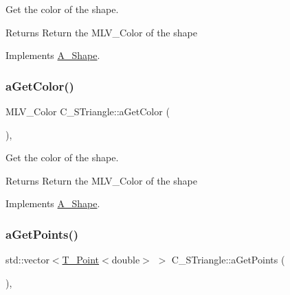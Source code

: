 Get the color of the shape. 

\begin{DoxyReturn}{Returns}
Return the M\+L\+V\+\_\+\+Color of the shape 
\end{DoxyReturn}


Implements \hyperlink{classA__Shape_a1e90c8132d33e4ac84d42f72606193b2}{A\+\_\+\+Shape}.

\mbox{\label{classC__STriangle_a1a0c315653ece65118705648d09336dd}} 
\subsubsection{\texorpdfstring{a\+Get\+Color()}{aGetColor()}\hspace{0.1cm}{\footnotesize\ttfamily [2/2]}}
{\footnotesize\ttfamily M\+L\+V\+\_\+\+Color C\+\_\+\+S\+Triangle\+::a\+Get\+Color (\begin{DoxyParamCaption}{ }\end{DoxyParamCaption})\hspace{0.3cm}{\ttfamily [override]}, {\ttfamily [virtual]}}



Get the color of the shape. 

\begin{DoxyReturn}{Returns}
Return the M\+L\+V\+\_\+\+Color of the shape 
\end{DoxyReturn}


Implements \hyperlink{classA__Shape_a1e90c8132d33e4ac84d42f72606193b2}{A\+\_\+\+Shape}.

\mbox{\label{classC__STriangle_a6d0d4f162b755ed9886907e6d87784cf}} 
\subsubsection{\texorpdfstring{a\+Get\+Points()}{aGetPoints()}\hspace{0.1cm}{\footnotesize\ttfamily [1/2]}}
{\footnotesize\ttfamily std\+::vector$<$\hyperlink{classT__Point}{T\+\_\+\+Point}$<$double$>$ $>$ C\+\_\+\+S\+Triangle\+::a\+Get\+Points (\begin{DoxyParamCaption}{ }\end{DoxyParamCaption})\hspace{0.3cm}{\ttfamily [override]}, {\ttfamily [virtual]}}



